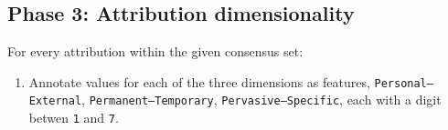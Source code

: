 \documentclass[a4paper,12pt]{article}
\begin{document}
    \subsection{Phase 3: Attribution dimensionality}
    For every attribution within the given consensus set:
        \begin{enumerate}
            \item Annotate values for each of the three dimensions as features, \texttt{Personal--External}, \texttt{Permanent--Temporary}, \texttt{Pervasive--Specific}, each with a digit betwen \texttt{1} and \texttt{7}.
        \end{enumerate}
\end{document}
